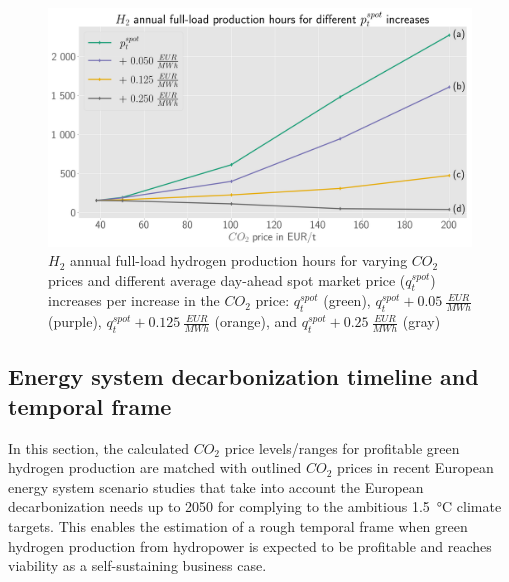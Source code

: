 \documentclass[review]{elsarticle}
\begin{document}
\begin{figure}[h]
	\centering
	\includegraphics[width=0.9\linewidth]{figures/utilization_v0.1.png}
	\caption{$H_2$ annual full-load hydrogen production hours for varying $CO_2$ prices and different average day-ahead spot market price ($q_{t}^{spot}$) increases per increase in the $CO_2$ price: $q_{t}^{spot}$ (green), $q_{t}^{spot} + \SI{0.05}{\frac{EUR}{MWh}}$ (purple), $q_{t}^{spot} + \SI{0.125}{\frac{EUR}{MWh}}$ (orange), and $q_{t}^{spot} + \SI{0.25}{\frac{EUR}{MWh}}$ (gray)} 
	\label{fig:full_load}
\end{figure}

\subsection{Energy system decarbonization timeline and temporal frame}\label{res:5_time}
In this section, the calculated $CO_2$ price levels/ranges for profitable green hydrogen production are matched with outlined $CO_2$ prices in recent European energy system scenario studies that take into account the European decarbonization needs up to 2050 for complying to the ambitious \SI{1.5}{\degreeCelsius} climate targets. This enables the estimation of a rough temporal frame when green hydrogen production from hydropower is expected to be profitable and reaches viability as a self-sustaining business case.\vspace{0.3cm}
\end{document}
